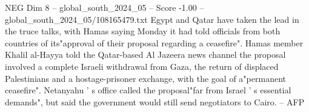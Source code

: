 \begin{textsample}{NEG Dim 8 – global\_south\_2024\_05 – Score -1.00 – global\_south\_2024\_05/108165479.txt}
Egypt and Qatar have taken the lead in the truce talks, with Hamas saying Monday it had told officials from both countries of its"approval of their proposal regarding a ceasefire".
Hamas member Khalil al-Hayya told the Qatar-based Al Jazeera news channel the proposal involved a complete Israeli withdrawal from Gaza, the return of displaced Palestinians and a hostage-prisoner exchange, with the goal of a"permanent ceasefire".
Netanyahu ' s office called the proposal"far from Israel ' s essential demands", but said the government would still send negotiators to Cairo. -- AFP

\end{textsample}
